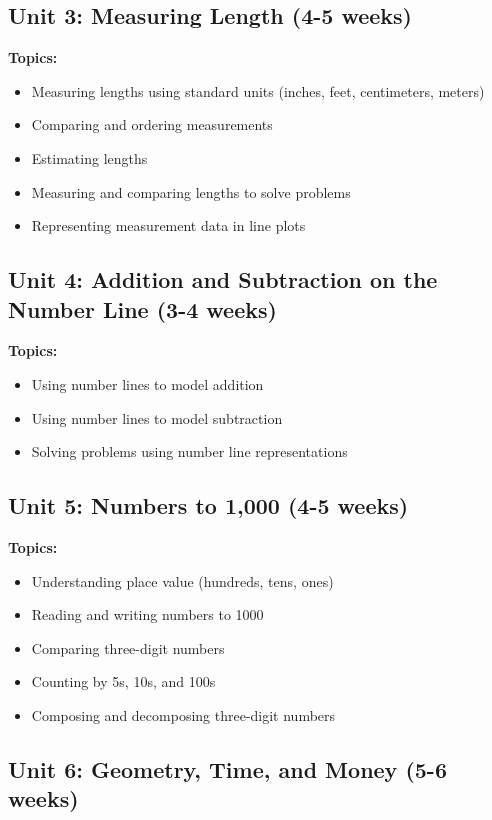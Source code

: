 \documentclass[11pt,letterpaper]{report}
\begin{document}
\subsection{Unit 3: Measuring Length (4-5 weeks)}

\textbf{Topics:}
\begin{itemize}
    \item Measuring lengths using standard units (inches, feet, centimeters, meters)
    \item Comparing and ordering measurements
    \item Estimating lengths
    \item Measuring and comparing lengths to solve problems
    \item Representing measurement data in line plots
\end{itemize}

\subsection{Unit 4: Addition and Subtraction on the Number Line (3-4 weeks)}

\textbf{Topics:}
\begin{itemize}
    \item Using number lines to model addition
    \item Using number lines to model subtraction
    \item Solving problems using number line representations
\end{itemize}

\subsection{Unit 5: Numbers to 1,000 (4-5 weeks)}

\textbf{Topics:}
\begin{itemize}
    \item Understanding place value (hundreds, tens, ones)
    \item Reading and writing numbers to 1000
    \item Comparing three-digit numbers
    \item Counting by 5s, 10s, and 100s
    \item Composing and decomposing three-digit numbers
\end{itemize}

\subsection{Unit 6: Geometry, Time, and Money (5-6 weeks)}
\end{document}
